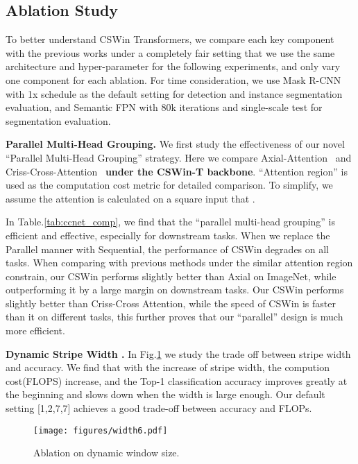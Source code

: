 \documentclass[10pt,twocolumn,letterpaper]{article}
\begin{document}
\subsection{Ablation Study}
To better understand CSWin Transformers, we compare each key component with the previous works under a completely fair setting that we use the same architecture and hyper-parameter for the following experiments, and only vary one component for each ablation. For time consideration, we use Mask R-CNN with 1x schedule as the default setting for detection and instance segmentation evaluation, and Semantic FPN with 80k iterations and single-scale test for segmentation evaluation.




\noindent \textbf{Parallel Multi-Head Grouping.}
We first study the effectiveness of our novel ``Parallel Multi-Head Grouping'' strategy. Here we compare Axial-Attention~\cite{ho2019axial} and Criss-Cross-Attention~\cite{huang2020ccnet} \textbf{under the CSWin-T backbone}. ``Attention region'' is used as the computation cost metric for detailed comparison. To simplify, we assume the attention is calculated on a square input that . 

In Table.\ref{tab:ccnet_comp}, we find that the ``parallel multi-head grouping'' is efficient and effective, especially for downstream tasks. When we replace the Parallel manner with Sequential, the performance of CSWin degrades on all tasks.
When comparing with previous methods under the similar attention region constrain, our  CSWin performs slightly better than Axial on ImageNet, while outperforming it by a large margin on downstream tasks. Our  CSWin performs slightly better than Criss-Cross Attention, while the speed of CSWin is  faster than it on different tasks, this further proves that our ``parallel'' design is much more efficient.

\noindent \textbf{Dynamic Stripe Width .}
In Fig.\ref{fig:sw} we study the trade off between stripe width and accuracy. We find that with the increase of stripe width, the compution cost(FLOPS) increase, and the Top-1 classification accuracy improves greatly at the beginning and slows down when the width is large enough. Our default setting [1,2,7,7] achieves a good trade-off between accuracy and FLOPs.


\begin{figure}[t]
\centering
\texttt{[image: figures/width6.pdf]} 
\vspace{-8mm}
\caption{Ablation on dynamic window size.}
\label{fig:sw}
\vspace{-4mm}
\end{figure}
\end{document}
